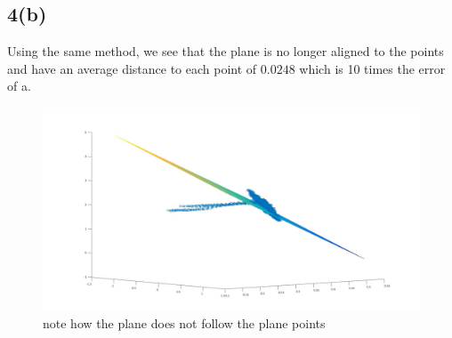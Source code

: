 \documentclass{article}
\begin{document}
\subsection*{4(b)}
Using the same method, we see that the plane is no longer aligned to the points and have an average distance to each point of $0.0248$ which is 10 times the error of a.
\begin{figure}[H]
\centering
\includegraphics[width=5in]{figures/q4b.jpg}
\caption{note how the plane does not follow the plane points}
\end{figure}
\end{document}
